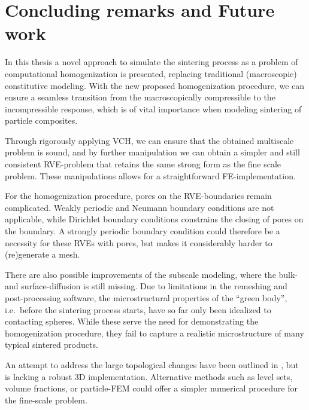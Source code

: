 \documentclass[MikaelDissertation.tex]{subfiles}
\begin{document}
\chapter{Concluding remarks and Future work}

In this thesis a novel approach to simulate the sintering process as a problem of computational homogenization is presented, replacing traditional (macroscopic) constitutive modeling.
With the new proposed homogenization procedure, we can ensure a seamless transition from the macroscopically compressible to the incompressible response, which is of vital importance when modeling sintering of particle composites.

Through rigorously applying VCH, we can ensure that the obtained multiscale problem is sound, and by further manipulation we can obtain a simpler and still consistent RVE-problem that retains the same strong form as the fine scale problem.
These manipulations allows for a straightforward FE-implementation.

For the homogenization procedure, pores on the RVE-boundaries remain complicated.
Weakly periodic and Neumann boundary conditions are not applicable, while Dirichlet boundary conditions constrains the closing of pores on the boundary.
A strongly periodic boundary condition could therefore be a necessity for these RVEs with pores, but makes it considerably harder to (re)generate a mesh.


There are also possible improvements of the subscale modeling, where the bulk- and surface-diffusion is still missing.
Due to limitations in the remeshing and post-processing software, the microstructural properties of the ``green body'', i.e.\ before the sintering process starts, have so far only been idealized to contacting spheres.
While these serve the need for demonstrating the homogenization procedure, they fail to capture a realistic microstructure of many typical sintered products.

An attempt to address the large topological changes have been outlined in , but is lacking a robust 3D implementation.
Alternative methods such as level sets, volume fractions, or particle-FEM could offer a simpler numerical procedure for the fine-scale problem.
\end{document}
